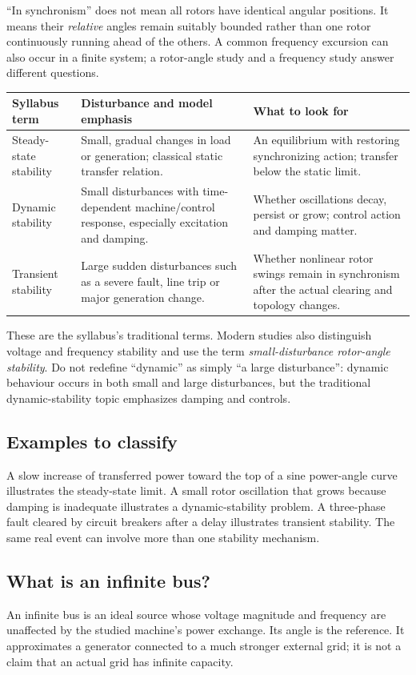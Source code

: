 \documentclass[11pt,a4paper]{article}
\begin{document}
``In synchronism'' does not mean all rotors have identical angular positions. It means their \emph{relative} angles remain suitably bounded rather than one rotor continuously running ahead of the others. A common frequency excursion can also occur in a finite system; a rotor-angle study and a frequency study answer different questions.
\begin{center}\small\begin{tabularx}{\textwidth}{L{.19\textwidth}Y Y}
\toprule Syllabus term & Disturbance and model emphasis & What to look for\\\midrule
Steady-state stability & Small, gradual changes in load or generation; classical static transfer relation. & An equilibrium with restoring synchronizing action; transfer below the static limit.\\
Dynamic stability & Small disturbances with time-dependent machine/control response, especially excitation and damping. & Whether oscillations decay, persist or grow; control action and damping matter.\\
Transient stability & Large sudden disturbances such as a severe fault, line trip or major generation change. & Whether nonlinear rotor swings remain in synchronism after the actual clearing and topology changes.\\\bottomrule
\end{tabularx}\end{center}
These are the syllabus's traditional terms. Modern studies also distinguish voltage and frequency stability and use the term \emph{small-disturbance rotor-angle stability}. Do not redefine ``dynamic'' as simply ``a large disturbance'': dynamic behaviour occurs in both small and large disturbances, but the traditional dynamic-stability topic emphasizes damping and controls.
\subsection{Examples to classify}
A slow increase of transferred power toward the top of a sine power-angle curve illustrates the steady-state limit. A small rotor oscillation that grows because damping is inadequate illustrates a dynamic-stability problem. A three-phase fault cleared by circuit breakers after a delay illustrates transient stability. The same real event can involve more than one stability mechanism.
\subsection{What is an infinite bus?}
An infinite bus is an ideal source whose voltage magnitude and frequency are unaffected by the studied machine's power exchange. Its angle is the reference. It approximates a generator connected to a much stronger external grid; it is not a claim that an actual grid has infinite capacity.
\end{document}
